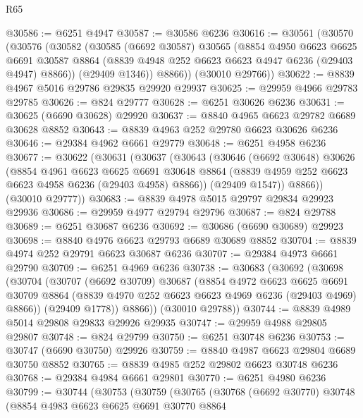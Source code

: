\begin{lexlean}{R65}
\begin{coremodule}
{@30586 := @6251 @4947
@30587 := @30586 @6236
@30616 := @30561
    (@30570
      (@30576
        (@30582
          (@30585
            (@6692 @30587)
            @30565
            (@8854
              @4950
              @6623
              @6625
              @6691
              @30587
              @8864
              (@8839 @4948 @252 @6623 @6623 @4947 @6236 (@29403 @4947) @8866))
            (@29409 @1346))
          @8866))
      (@30010 @29766))
@30622 := @8839 @4967 @5016 @29786 @29835 @29920 @29937
@30625 := @29959 @4966 @29783 @29785
@30626 := @824 @29777
@30628 := @6251 @30626 @6236
@30631 := @30625 (@6690 @30628) @29920
@30637 := @8840 @4965 @6623 @29782 @6689 @30628 @8852
@30643 := @8839 @4963 @252 @29780 @6623 @30626 @6236
@30646 := @29384 @4962 @6661 @29779
@30648 := @6251 @4958 @6236
@30677 := @30622
    (@30631
      (@30637
        (@30643
          (@30646
            (@6692 @30648)
            @30626
            (@8854
              @4961
              @6623
              @6625
              @6691
              @30648
              @8864
              (@8839 @4959 @252 @6623 @6623 @4958 @6236 (@29403 @4958) @8866))
            (@29409 @1547))
          @8866))
      (@30010 @29777))
@30683 := @8839 @4978 @5015 @29797 @29834 @29923 @29936
@30686 := @29959 @4977 @29794 @29796
@30687 := @824 @29788
@30689 := @6251 @30687 @6236
@30692 := @30686 (@6690 @30689) @29923
@30698 := @8840 @4976 @6623 @29793 @6689 @30689 @8852
@30704 := @8839 @4974 @252 @29791 @6623 @30687 @6236
@30707 := @29384 @4973 @6661 @29790
@30709 := @6251 @4969 @6236
@30738 := @30683
    (@30692
      (@30698
        (@30704
          (@30707
            (@6692 @30709)
            @30687
            (@8854
              @4972
              @6623
              @6625
              @6691
              @30709
              @8864
              (@8839 @4970 @252 @6623 @6623 @4969 @6236 (@29403 @4969) @8866))
            (@29409 @1778))
          @8866))
      (@30010 @29788))
@30744 := @8839 @4989 @5014 @29808 @29833 @29926 @29935
@30747 := @29959 @4988 @29805 @29807
@30748 := @824 @29799
@30750 := @6251 @30748 @6236
@30753 := @30747 (@6690 @30750) @29926
@30759 := @8840 @4987 @6623 @29804 @6689 @30750 @8852
@30765 := @8839 @4985 @252 @29802 @6623 @30748 @6236
@30768 := @29384 @4984 @6661 @29801
@30770 := @6251 @4980 @6236
@30799 := @30744
    (@30753
      (@30759
        (@30765
          (@30768
            (@6692 @30770)
            @30748
            (@8854
              @4983
              @6623
              @6625
              @6691
              @30770
              @8864
}
\end{coremodule}
\end{lexlean}
